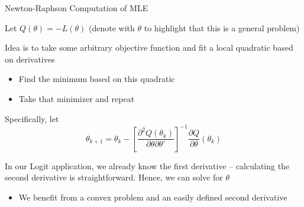 \documentclass[notes,11pt, aspectratio=169]{beamer}
\newenvironment{wideitemize}{\itemize\addtolength{\itemsep}{10pt}}{\enditemize}
\begin{document}
  \begin{frame}{Newton-Raphson Computation of MLE}
    \begin{wideitemize}
    \item Let $Q(\theta) = -L(\theta)$ (denote with $\theta$ to
      highlight that this is a general problem)
    \item Idea is to take some arbitrary objective function and fit a
      local quadratic based on derivatives
      \begin{itemize}
      \item Find the minimum based on this quadratic
      \item Take that minimizer and repeat
      \end{itemize}
    \item Specifically, let
      $$ \theta_{k+1} = \theta_{k} - \left[\frac{\partial^{2}Q(\theta_{k})}{\partial\theta \partial \theta'}\right]^{-1}\frac{\partial Q}{\partial \theta}(\theta_{k})$$
    \item In our Logit application, we already know the first derivative -- calculating the second derivative is straightforward. Hence, we can solve for $\theta$
      \begin{itemize}
      \item We benefit from a convex problem and an easily defined second derivative
      \end{itemize}
    \end{wideitemize}
  \end{frame}
\end{document}

